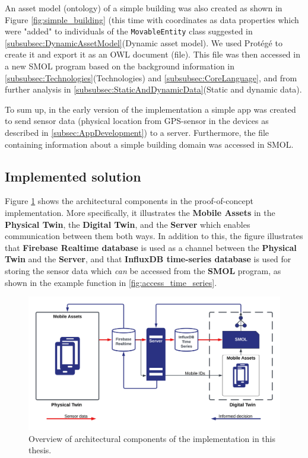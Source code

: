 \documentclass{article}
\begin{document}
An asset model (ontology) of a simple building was also created as shown in Figure \ref{fig:simple_building} (this time with coordinates as data properties which were "added" to individuals of the \verb|MovableEntity| class suggested in \ref{subsubsec:DynamicAssetModel}(Dynamic asset model). We used Protégé to create it and export it as an OWL document (file). This file was then accessed in a new SMOL program based on the background information in \ref{subsubsec:Technologies}(Technologies) and \ref{subsubsec:CoreLanguage}, and from further analysis in \ref{subsubsec:StaticAndDynamicData}(Static and dynamic data). 

To sum up, in the early version of the implementation a simple app was created to send sensor data (physical location from GPS-sensor in the devices as described in \ref{subsec:AppDevelopment}) to a server. Furthermore, the file containing information about a simple building domain was accessed in SMOL.


\subsection{Implemented solution}\label{subsec:ImplementedSolution}
Figure \ref{fig:components} shows the architectural components in the proof-of-concept implementation. More specifically, it illustrates the \textbf{Mobile Assets} in the \textbf{Physical Twin}, the \textbf{Digital Twin}, and the \textbf{Server} which enables communication between them both ways. In addition to this, the figure illustrates that \textbf{Firebase Realtime database} is used as a channel between the \textbf{Physical Twin} and the \textbf{Server}, and that \textbf{InfluxDB time-series database} is used for storing the sensor data which \emph{can} be accessed from the \textbf{SMOL} program, as shown in the example function in \ref{fig:access_time_series}.

\begin{figure}[H]
    \centering
    \includegraphics[scale=0.12]{graphics/thesis_overview.png}
    \caption{Overview of architectural components of the implementation in this thesis.}
    \label{fig:components}
\end{figure}
\end{document}
